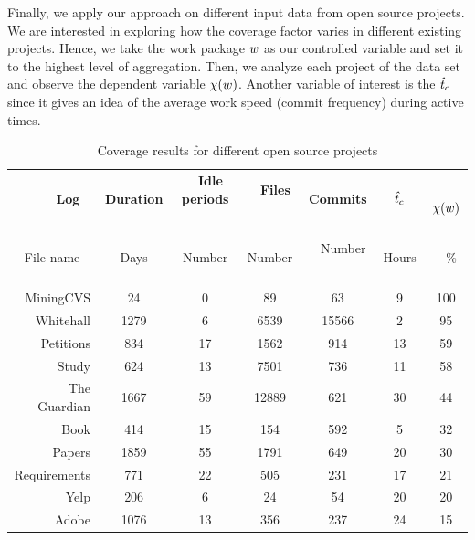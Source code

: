 Finally, we apply our approach on different input data from open source projects. We are interested in exploring how the coverage factor varies in different existing projects. Hence, we take the work package $w$ as our controlled variable and set it to the highest level of aggregation. Then, we analyze each project of the data set and observe the dependent variable $\chi(w)$.
Another variable of interest is the $\mathit{\hat{t}_{c}}$ since it gives an idea of the average work speed (commit frequency) during active times.

\begin{table}
\caption{Coverage results for different open source projects}
\label{tab:experiments}
\centering
\begin{tabular}{rcccccc}
\hline\noalign{\smallskip}
\textbf{Log} ~&~ \textbf{Duration} ~&~ \textbf{Idle periods} ~&~ \textbf{Files} ~&~	 \textbf{Commits} ~&~	\textbf{$\mathit{\hat{t}_{c}}$} ~&~ \textbf{$\chi(w)$}\\
File name ~&~ Days ~&~ Number ~&~ Number ~&~ Number ~&~ Hours ~&~ \% \\
\hline \hline
\noalign{\medskip}
MiningCVS &	24 & 0 & 89  &	 63 & 9 & 100 \\

Whitehall & 1279 & 6 & 6539  &	15566 & 2 & 95 \\

Petitions &	834 & 17 & 1562  &	914 & 13 & 59 \\

Study &	624 & 13 & 7501  &	736 & 11 & 58 \\

The Guardian &	1667 & 59 & 12889  &	 621 & 30 & 44 \\

Book &	414 & 15 & 154  & 592 & 5 & 32 \\

Papers &	 1859 & 55 & 1791  &	 649 & 20 & 30 \\

Requirements & 771 & 22 & 505  &	231 & 17 & 21 \\

Yelp &	206 & 6 & 24  &	54 & 20 & 20 \\

Adobe &	1076 & 13 & 356  &	237 & 24 & 15 \\

\hline
\end{tabular}%
\end{table}


